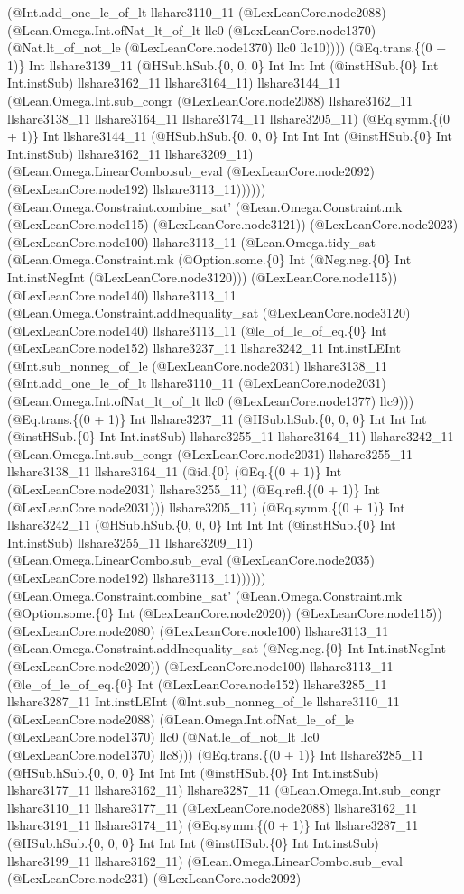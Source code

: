 \documentclass[11pt]{article}
\begin{document}
(@Int.add\_one\_le\_of\_lt llshare3110\_11 (@LexLeanCore.node2088) (@Lean.Omega.Int.ofNat\_lt\_of\_lt llc0 (@LexLeanCore.node1370) (@Nat.lt\_of\_not\_le (@LexLeanCore.node1370) llc0 llc10)))) (@Eq.trans.\{(0 + 1)\} Int llshare3139\_11 (@HSub.hSub.\{0, 0, 0\} Int Int Int (@instHSub.\{0\} Int Int.instSub) llshare3162\_11 llshare3164\_11) llshare3144\_11 (@Lean.Omega.Int.sub\_congr (@LexLeanCore.node2088) llshare3162\_11 llshare3138\_11 llshare3164\_11 llshare3174\_11 llshare3205\_11) (@Eq.symm.\{(0 + 1)\} Int llshare3144\_11 (@HSub.hSub.\{0, 0, 0\} Int Int Int (@instHSub.\{0\} Int Int.instSub) llshare3162\_11 llshare3209\_11) (@Lean.Omega.LinearCombo.sub\_eval (@LexLeanCore.node2092) (@LexLeanCore.node192) llshare3113\_11)))))) (@Lean.Omega.Constraint.combine\_sat' (@Lean.Omega.Constraint.mk (@LexLeanCore.node115) (@LexLeanCore.node3121)) (@LexLeanCore.node2023) (@LexLeanCore.node100) llshare3113\_11 (@Lean.Omega.tidy\_sat (@Lean.Omega.Constraint.mk (@Option.some.\{0\} Int (@Neg.neg.\{0\} Int Int.instNegInt (@LexLeanCore.node3120))) (@LexLeanCore.node115)) (@LexLeanCore.node140) llshare3113\_11 (@Lean.Omega.Constraint.addInequality\_sat (@LexLeanCore.node3120) (@LexLeanCore.node140) llshare3113\_11 (@le\_of\_le\_of\_eq.\{0\} Int (@LexLeanCore.node152) llshare3237\_11 llshare3242\_11 Int.instLEInt (@Int.sub\_nonneg\_of\_le (@LexLeanCore.node2031) llshare3138\_11 (@Int.add\_one\_le\_of\_lt llshare3110\_11 (@LexLeanCore.node2031) (@Lean.Omega.Int.ofNat\_lt\_of\_lt llc0 (@LexLeanCore.node1377) llc9))) (@Eq.trans.\{(0 + 1)\} Int llshare3237\_11 (@HSub.hSub.\{0, 0, 0\} Int Int Int (@instHSub.\{0\} Int Int.instSub) llshare3255\_11 llshare3164\_11) llshare3242\_11 (@Lean.Omega.Int.sub\_congr (@LexLeanCore.node2031) llshare3255\_11 llshare3138\_11 llshare3164\_11 (@id.\{0\} (@Eq.\{(0 + 1)\} Int (@LexLeanCore.node2031) llshare3255\_11) (@Eq.refl.\{(0 + 1)\} Int (@LexLeanCore.node2031))) llshare3205\_11) (@Eq.symm.\{(0 + 1)\} Int llshare3242\_11 (@HSub.hSub.\{0, 0, 0\} Int Int Int (@instHSub.\{0\} Int Int.instSub) llshare3255\_11 llshare3209\_11) (@Lean.Omega.LinearCombo.sub\_eval (@LexLeanCore.node2035) (@LexLeanCore.node192) llshare3113\_11)))))) (@Lean.Omega.Constraint.combine\_sat' (@Lean.Omega.Constraint.mk (@Option.some.\{0\} Int (@LexLeanCore.node2020)) (@LexLeanCore.node115)) (@LexLeanCore.node2080) (@LexLeanCore.node100) llshare3113\_11 (@Lean.Omega.Constraint.addInequality\_sat (@Neg.neg.\{0\} Int Int.instNegInt (@LexLeanCore.node2020)) (@LexLeanCore.node100) llshare3113\_11 (@le\_of\_le\_of\_eq.\{0\} Int (@LexLeanCore.node152) llshare3285\_11 llshare3287\_11 Int.instLEInt (@Int.sub\_nonneg\_of\_le llshare3110\_11 (@LexLeanCore.node2088) (@Lean.Omega.Int.ofNat\_le\_of\_le (@LexLeanCore.node1370) llc0 (@Nat.le\_of\_not\_lt llc0 (@LexLeanCore.node1370) llc8))) (@Eq.trans.\{(0 + 1)\} Int llshare3285\_11 (@HSub.hSub.\{0, 0, 0\} Int Int Int (@instHSub.\{0\} Int Int.instSub) llshare3177\_11 llshare3162\_11) llshare3287\_11 (@Lean.Omega.Int.sub\_congr llshare3110\_11 llshare3177\_11 (@LexLeanCore.node2088) llshare3162\_11 llshare3191\_11 llshare3174\_11) (@Eq.symm.\{(0 + 1)\} Int llshare3287\_11 (@HSub.hSub.\{0, 0, 0\} Int Int Int (@instHSub.\{0\} Int Int.instSub) llshare3199\_11 llshare3162\_11) (@Lean.Omega.LinearCombo.sub\_eval (@LexLeanCore.node231) (@LexLeanCore.node2092) 
\end{document}
